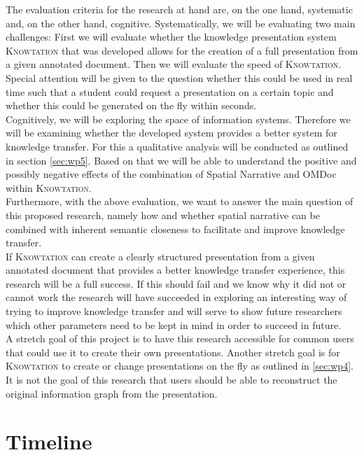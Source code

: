 \documentclass[twoside, 12pt]{article}
\newcommand{\sys}{\textsc{Knowtation}\xspace}
\begin{document}
The evaluation criteria for the research at hand are, on the one hand, systematic and, on the other hand, cognitive. Systematically, we will be evaluating two main challenges: First we will evaluate whether the knowledge presentation system \sys that was developed allows for the creation of a full presentation from a given annotated document. Then we will evaluate the speed of \sys. Special attention will be given to the question whether this could be used in real time such that a student could request a presentation on a certain topic and whether this could be generated on the fly within seconds.\\

Cognitively, we will be exploring the space of information systems. Therefore we will be examining whether the developed system provides a better system for knowledge transfer. For this a qualitative analysis will be conducted as outlined in section \ref{sec:wp5}. Based on that we will be able to understand the positive and possibly negative effects of the combination of Spatial Narrative and OMDoc within \sys .\\

Furthermore, with the above evaluation, we want to answer the main question of this proposed research, namely how and whether spatial narrative can be combined with inherent semantic closeness to facilitate and improve knowledge transfer.\\

If \sys can create a clearly structured presentation from a given annotated document that provides a better knowledge transfer experience, this research will be a full success. If this should fail and we know why it did not or cannot work the research will have succeeded in exploring an interesting way of trying to improve knowledge transfer and will serve to show future researchers which other parameters need to be kept in mind in order to succeed in future.\\

A stretch goal of this project is to have this research accessible for common users that could use it to create their own presentations. Another stretch goal is for \sys to create or change presentations on the fly as outlined in \ref{sec:wp4}. It is not the goal of this research that users should be able to reconstruct the original information graph from the presentation.\\
\newpage
\section{Timeline}
\label{sec:timeline}
\end{document}
